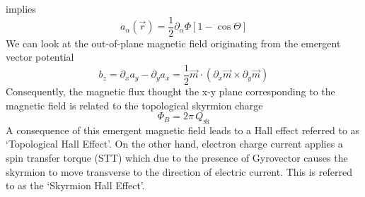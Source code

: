 \documentclass[aps,prb,onecolumn,notitlepage,showpacs,floatfix,superscriptaddress]{revtex4-1}
\newcommand{\mrm}[1]{\mathrm{#1}}
\begin{document}
implies
\begin{equation}
a_{\alpha} (\vec{r}) = \dfrac{1}{2} \partial_\alpha \Phi [1-\cos\Theta]
\end{equation}
We can look at the out-of-plane magnetic field originating from the emergent vector potential
\begin{equation}
b_z = \partial_x a_y - \partial_y a_x = \dfrac{1}{2} \vec{m} \cdot (\partial_x \vec{m} \times \partial_y \vec{m})
\end{equation}
Consequently, the magnetic flux thought the x-y plane corresponding to the magnetic field is related to the topological skyrmion charge
\begin{equation}
\Phi_B = 2\pi \, Q_\mrm{sk}
\end{equation}
A consequence of this emergent magnetic field leads to a Hall effect referred to as `Topological Hall Effect'. On the other hand, electron charge current applies a spin transfer torque (STT) which due to the presence of Gyrovector causes the skyrmion to move transverse to the direction of electric current. This is referred to as the `Skyrmion Hall Effect'.\\
\end{document}
